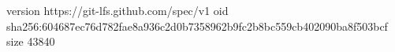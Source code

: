 version https://git-lfs.github.com/spec/v1
oid sha256:604687ec76d782fae8a936c2d0b7358962b9fc2b8bc559cb402090ba8f503bcf
size 43840
